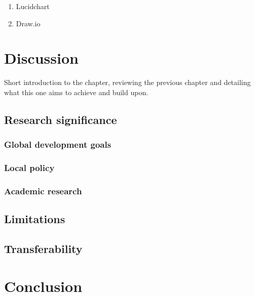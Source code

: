 \documentclass[
  12pt,
  oneside]{book}
\providecommand{\tightlist}{%
  \setlength{\itemsep}{0pt}\setlength{\parskip}{0pt}}
\begin{document}
\begin{enumerate}
\def\labelenumi{\arabic{enumi}.}
\tightlist
\item
  Lucidchart
\item
  Draw.io
\end{enumerate}

\hypertarget{discussion}{%
\chapter{Discussion}\label{discussion}}

Short introduction to the chapter, reviewing the previous chapter and detailing what this one aims to achieve and build upon.

\hypertarget{research-significance}{%
\section{Research significance}\label{research-significance}}

\hypertarget{global-development-goals}{%
\subsection{Global development goals}\label{global-development-goals}}

\hypertarget{local-policy}{%
\subsection{Local policy}\label{local-policy}}

\hypertarget{academic-research}{%
\subsection{Academic research}\label{academic-research}}

\hypertarget{limitations}{%
\section{Limitations}\label{limitations}}

\hypertarget{transferability}{%
\section{Transferability}\label{transferability}}

\hypertarget{conclusion}{%
\chapter{Conclusion}\label{conclusion}}
\end{document}
